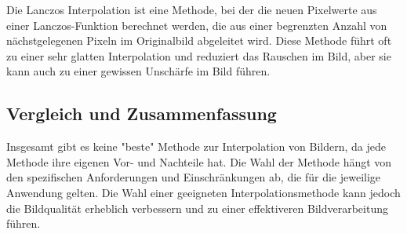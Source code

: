 Die Lanczos Interpolation ist eine Methode, bei der die neuen Pixelwerte aus einer Lanczos-Funktion berechnet werden, die aus einer begrenzten Anzahl von nächstgelegenen Pixeln im Originalbild abgeleitet wird. 
Diese Methode führt oft zu einer sehr glatten Interpolation und reduziert das Rauschen im Bild, aber sie kann auch zu einer gewissen Unschärfe im Bild führen.

\subsection{Vergleich und Zusammenfassung}

Insgesamt gibt es keine "beste" Methode zur Interpolation von Bildern, da jede Methode ihre eigenen Vor- und Nachteile hat. 
Die Wahl der Methode hängt von den spezifischen Anforderungen und Einschränkungen ab, die für die jeweilige Anwendung gelten. 
Die Wahl einer geeigneten Interpolationsmethode kann jedoch die Bildqualität erheblich verbessern und zu einer effektiveren Bildverarbeitung führen.
\newpage
